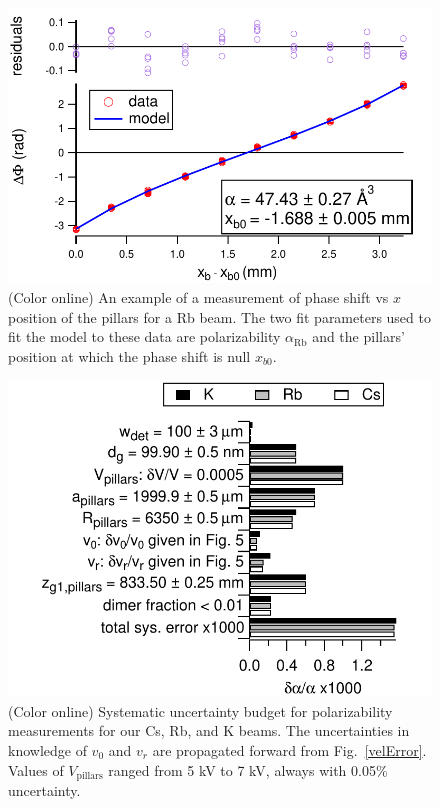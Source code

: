 \documentclass[twocolumn,pra,showpacs,superscriptaddress,longbibliography]{revtex4-1}   %
\newcommand{\figref}[1]{Fig.~\ref{#1}}
\newcommand{\arb}{\alpha_{\textrm{Rb}}}
\begin{document}
\begin{figure}
\includegraphics[width=\linewidth,keepaspectratio]{dPvMP_150327_q.pdf}
\caption{\label{dPvMPExample}(Color online) An example of a measurement of phase shift vs $x$ position of the pillars for a Rb beam. The two fit parameters used to fit the model to these data are polarizability $\arb$ and the pillars' position at which the phase shift is null $x_{b0}$.}
\end{figure}

\begin{figure}
\includegraphics[width=\linewidth,keepaspectratio]{displayPolErrors.pdf}
\caption{\label{polError}(Color online) Systematic uncertainty budget for polarizability measurements for our Cs, Rb, and K beams.
The uncertainties in knowledge of $v_0$ and $v_r$ are propagated forward from \figref{velError}.
Values of $V_{\mathrm{pillars}}$ ranged from 5 kV to 7 kV, always with 0.05\% uncertainty.}
\end{figure}
\end{document}
